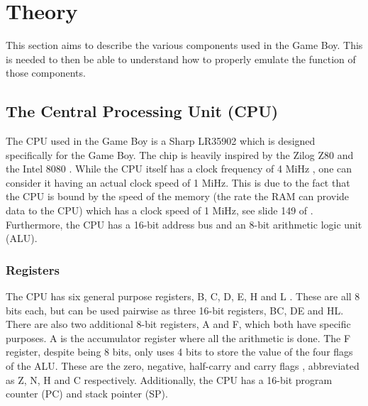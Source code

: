 \chapter{Theory}
\label{chap:Theory}

This section aims to describe the various components used in the Game Boy. This is needed to then be able to understand how to properly emulate the function of those components.

\section{The Central Processing Unit (CPU)}
The CPU used in the Game Boy is a Sharp LR35902 \cite{pandoscspecifications} \cite{gameboyhistory} which is designed specifically for the Game Boy. The chip is heavily inspired by the Zilog Z80 \cite{Z80} and the Intel 8080 \cite{Intel8080}. While the CPU itself has a clock frequency of 4 MiHz \cite{pandoscspecifications}, one can consider it having an actual clock speed of 1 MiHz. 
This is due to the fact that the CPU is bound by the speed of the memory \cite{GBTClockSpeed} (the rate the RAM can provide data to the CPU) which has a clock speed of 1 MiHz, see slide 149 of  \cite{ultimateGBtalkSlides}. 
Furthermore, the CPU has a 16-bit address bus \cite{pandocsmemorymap} and an 8-bit arithmetic logic unit (ALU).
\subsection{Registers}
The CPU has six general purpose registers, B, C, D, E, H and L \cite{pandocsregistersandflags}. These are all 8 bits each, but can be used pairwise as three 16-bit registers, BC, DE and HL. There are also two additional 8-bit registers, A and F, which both have specific purposes. A is the accumulator register where all the arithmetic is done. The F register, despite being 8 bits, only uses 4 bits to store the value of the four flags of the ALU. These are the zero, negative, half-carry and carry flags \cite{pandocsregistersandflags}, abbreviated as Z, N, H and C respectively. Additionally, the CPU has a 16-bit program counter (PC) and stack pointer (SP).


